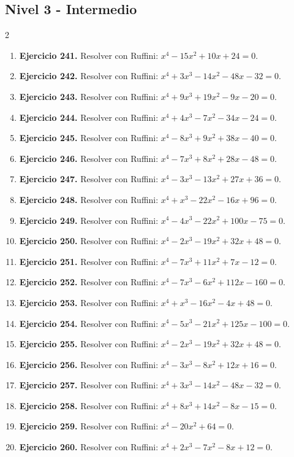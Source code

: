\documentclass[10pt,a4paper]{article}
\newcommand{\nivel}[1]{\subsection*{#1}\addcontentsline{toc}{subsection}{#1}}
\begin{document}
\nivel{Nivel 3 - Intermedio}
\begin{multicols}{2}
\begin{enumerate}[label=\textbf{\arabic*.}]
\item \textbf{Ejercicio 241.} Resolver con Ruffini: \(x^{4} - 15 x^{2} + 10 x + 24=0\).
\item \textbf{Ejercicio 242.} Resolver con Ruffini: \(x^{4} + 3 x^{3} - 14 x^{2} - 48 x - 32=0\).
\item \textbf{Ejercicio 243.} Resolver con Ruffini: \(x^{4} + 9 x^{3} + 19 x^{2} - 9 x - 20=0\).
\item \textbf{Ejercicio 244.} Resolver con Ruffini: \(x^{4} + 4 x^{3} - 7 x^{2} - 34 x - 24=0\).
\item \textbf{Ejercicio 245.} Resolver con Ruffini: \(x^{4} - 8 x^{3} + 9 x^{2} + 38 x - 40=0\).
\item \textbf{Ejercicio 246.} Resolver con Ruffini: \(x^{4} - 7 x^{3} + 8 x^{2} + 28 x - 48=0\).
\item \textbf{Ejercicio 247.} Resolver con Ruffini: \(x^{4} - 3 x^{3} - 13 x^{2} + 27 x + 36=0\).
\item \textbf{Ejercicio 248.} Resolver con Ruffini: \(x^{4} + x^{3} - 22 x^{2} - 16 x + 96=0\).
\item \textbf{Ejercicio 249.} Resolver con Ruffini: \(x^{4} - 4 x^{3} - 22 x^{2} + 100 x - 75=0\).
\item \textbf{Ejercicio 250.} Resolver con Ruffini: \(x^{4} - 2 x^{3} - 19 x^{2} + 32 x + 48=0\).
\item \textbf{Ejercicio 251.} Resolver con Ruffini: \(x^{4} - 7 x^{3} + 11 x^{2} + 7 x - 12=0\).
\item \textbf{Ejercicio 252.} Resolver con Ruffini: \(x^{4} - 7 x^{3} - 6 x^{2} + 112 x - 160=0\).
\item \textbf{Ejercicio 253.} Resolver con Ruffini: \(x^{4} + x^{3} - 16 x^{2} - 4 x + 48=0\).
\item \textbf{Ejercicio 254.} Resolver con Ruffini: \(x^{4} - 5 x^{3} - 21 x^{2} + 125 x - 100=0\).
\item \textbf{Ejercicio 255.} Resolver con Ruffini: \(x^{4} - 2 x^{3} - 19 x^{2} + 32 x + 48=0\).
\item \textbf{Ejercicio 256.} Resolver con Ruffini: \(x^{4} - 3 x^{3} - 8 x^{2} + 12 x + 16=0\).
\item \textbf{Ejercicio 257.} Resolver con Ruffini: \(x^{4} + 3 x^{3} - 14 x^{2} - 48 x - 32=0\).
\item \textbf{Ejercicio 258.} Resolver con Ruffini: \(x^{4} + 8 x^{3} + 14 x^{2} - 8 x - 15=0\).
\item \textbf{Ejercicio 259.} Resolver con Ruffini: \(x^{4} - 20 x^{2} + 64=0\).
\item \textbf{Ejercicio 260.} Resolver con Ruffini: \(x^{4} + 2 x^{3} - 7 x^{2} - 8 x + 12=0\).
\end{enumerate}
\end{multicols}
\end{document}
